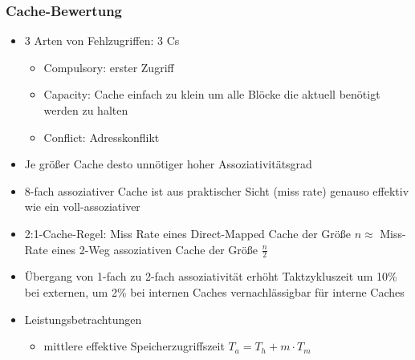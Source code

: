 \subsubsection{Cache-Bewertung}
\begin{itemize}
	\item
		3 Arten von Fehlzugriffen: 3 Cs
		\begin{itemize}
			\item
				Compulsory: erster Zugriff
			\item
				Capacity: Cache einfach zu klein um alle Blöcke die aktuell benötigt werden zu halten
			\item
				Conflict: Adresskonflikt
		\end{itemize}
	\item
		Je größer Cache desto unnötiger hoher Assoziativitätsgrad
	\item
		8-fach assoziativer Cache ist aus praktischer Sicht (miss rate) genauso effektiv  wie ein voll-assoziativer
	\item
		2:1-Cache-Regel: Miss Rate eines Direct-Mapped Cache der Größe $n \approx $ Miss-Rate eines 2-Weg assoziativen Cache der Größe $\frac{n}2$
	\item
		Übergang von 1-fach zu 2-fach assoziativität erhöht Taktzykluszeit um 10\% bei externen, um 2\% bei internen Caches \ra{} vernachlässigbar für interne Caches
	\item
		Leistungsbetrachtungen
		\begin{itemize}
			\item
				mittlere effektive Speicherzugriffszeit $T_a = T_h + m\cdot T_m$


\end{itemize}
\end{itemize}
